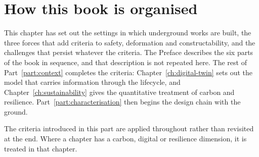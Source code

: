 \section{How this book is organised}
\label{sec:book-organisation}

This chapter has set out the settings in which underground works are built,
the three forces that add criteria to safety, deformation and
constructability, and the challenges that persist whatever the criteria. The
Preface describes the six parts of the book in sequence, and that description
is not repeated here. The rest of Part~\ref{part:context} completes the
criteria: Chapter~\ref{ch:digital-twin} sets out the model that carries
information through the lifecycle, and Chapter~\ref{ch:sustainability} gives
the quantitative treatment of carbon and resilience.
Part~\ref{part:characterisation} then begins the design chain with the ground.

The criteria introduced in this part are applied throughout rather than
revisited at the end. Where a chapter has a carbon, digital or resilience
dimension, it is treated in that chapter.

\chapterreferences
